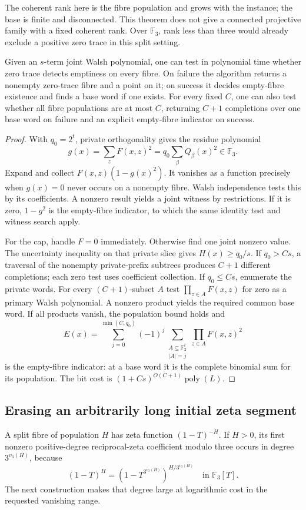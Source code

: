 The coherent rank here is the fibre population and grows with the instance; the base is finite and disconnected. This theorem does not give a connected projective family with a fixed coherent rank. Over $\mathbb F_3$, rank less than three would already exclude a positive zero trace in this split setting.

\begin{proposition}
\label{st:trace-cap}
Given an $s$-term joint Walsh polynomial, one can test in polynomial time whether zero trace detects emptiness on every fibre. On failure the algorithm returns a nonempty zero-trace fibre and a point on it; on success it decides empty-fibre existence and finds a base word if one exists. For every fixed $C$, one can also test whether all fibre populations are at most $C$, returning $C+1$ completions over one base word on failure and an explicit empty-fibre indicator on success.
\end{proposition}
\begin{proof}
With $q_0=2^t$, private orthogonality gives the residue polynomial
\[
 g(x)=\sum_zF(x,z)^2=q_0\sum_\beta Q_\beta(x)^2\in\mathbb F_3.
\]
Expand and collect $F(x,z)(1-g(x)^2)$. It vanishes as a function precisely when $g(x)=0$ never occurs on a nonempty fibre. Walsh independence tests this by its coefficients. A nonzero result yields a joint witness by restrictions. If it is zero, $1-g^2$ is the empty-fibre indicator, to which the same identity test and witness search apply.

For the cap, handle $F=0$ immediately. Otherwise find one joint nonzero value. The uncertainty inequality on that private slice gives $H(x)\ge q_0/s$. If $q_0>Cs$, a traversal of the nonempty private-prefix subtrees produces $C+1$ different completions; each zero test uses coefficient collection. If $q_0\le Cs$, enumerate the private words. For every $(C+1)$-subset $A$ test $\prod_{z\in A}F(x,z)$ for zero as a primary Walsh polynomial. A nonzero product yields the required common base word. If all products vanish, the population bound holds and
\[
 E(x)=\sum_{j=0}^{\min(C,q_0)}(-1)^j
       \sum_{\substack{A\subseteq\mathbb F_2^t\\|A|=j}}
                   \prod_{z\in A}F(x,z)^2
\]
is the empty-fibre indicator: at a base word it is the complete binomial sum for its population. The bit cost is $(1+Cs)^{O(C+1)}\operatorname{poly}(L)$.
\end{proof}

\subsection{Erasing an arbitrarily long initial zeta segment}
A split fibre of population $H$ has zeta function $(1-T)^{-H}$. If $H>0$, its first nonzero positive-degree reciprocal-zeta coefficient modulo three occurs in degree $3^{v_3(H)}$, because
\[
 (1-T)^H=(1-T^{3^{v_3(H)}})^{H/3^{v_3(H)}}
 \quad\text{in }\mathbb F_3[T].
\]
The next construction makes that degree large at logarithmic cost in the requested vanishing range.

